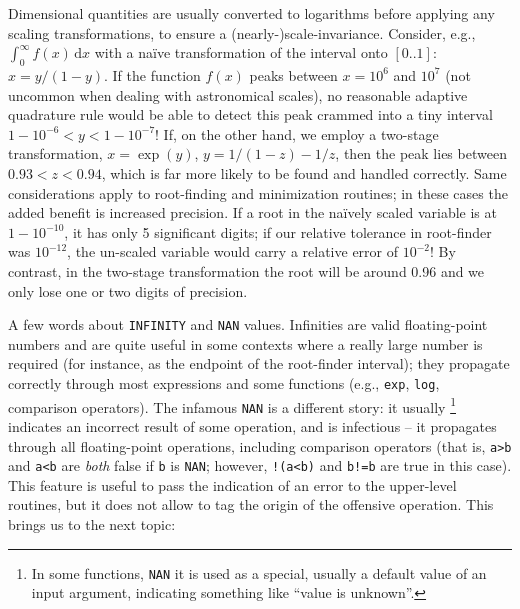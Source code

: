 \documentclass[12pt]{article}
\newcommand{\D}{\mathrm{d}}
\begin{document}
Dimensional quantities are usually converted to logarithms before applying any scaling transformations, to ensure a (nearly-)scale-invariance. Consider, e.g., $\int_0^\infty f(x)\,\D x$ with a na\"ive transformation of the interval onto $[0..1]$: $x = y/(1-y)$. If the function $f(x)$ peaks between $x=10^6$ and $10^7$ (not uncommon when dealing with astronomical scales), no reasonable adaptive quadrature rule would be able to detect this peak crammed into a tiny interval $1-10^{-6} < y < 1-10^{-7}$! If, on the other hand, we employ a two-stage transformation, $x = \exp(y)$, $y = 1/(1-z)-1/z$, then the peak lies between $0.93<z<0.94$, which is far more likely to be found and handled correctly. Same considerations apply to root-finding and minimization routines; in these cases the added benefit is increased precision. If a root in the na\"ively scaled variable is at $1-10^{-10}$, it has only 5 significant digits; if our relative tolerance in root-finder was $10^{-12}$, the un-scaled variable would carry a relative error of $10^{-2}$! By contrast, in the two-stage transformation the root will be around 0.96 and we only lose one or two digits of precision.

A few words about \texttt{INFINITY} and \texttt{NAN} values. Infinities are valid floating-point numbers and are quite useful in some contexts where a really large number is required (for instance, as the endpoint of the root-finder interval); they propagate correctly through most expressions and some functions (e.g., \texttt{exp}, \texttt{log}, comparison operators). The infamous \texttt{NAN} is a different story: it usually%
\footnote{In some functions, \texttt{NAN} it is used as a special, usually a default value of an input argument, indicating something like ``value is unknown''.}
indicates an incorrect result of some operation, and is infectious -- it propagates through all floating-point operations, including comparison operators (that is, \texttt{a>b} and \texttt{a<b} are \textit{both} false if \texttt{b} is \texttt{NAN}; however, \texttt{!(a<b)} and \texttt{b!=b} are true in this case). This feature is useful to pass the indication of an error to the upper-level routines, but it does not allow to tag the origin of the offensive operation. This brings us to the next topic:
\end{document}
